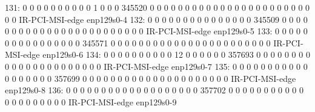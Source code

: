  131:          0          0          0          0          0          0          0          0          0          0          1          0          0          0     345520          0          0          0          0          0          0          0          0          0          0          0          0          0          0          0          0          0          0          0          0          0          0          0          0          0  IR-PCI-MSI-edge      enp129s0-4
 132:          0          0          0          0          0          0          0          0          0          0          0          0          0          0          0     345509          0          0          0          0          0          0          0          0          0          0          0          0          0          0          0          0          0          0          0          0          0          0          0          0  IR-PCI-MSI-edge      enp129s0-5
 133:          0          0          0          0          0          0          0          0          0          0          0          0          0          0          0          0     345571          0          0          0          0          0          0          0          0          0          0          0          0          0          0          0          0          0          0          0          0          0          0          0  IR-PCI-MSI-edge      enp129s0-6
 134:          0          0          0          0          0          0          0          0          0          0         12          0          0          0          0          0          0     357693          0          0          0          0          0          0          0          0          0          0          0          0          0          0          0          0          0          0          0          0          0          0  IR-PCI-MSI-edge      enp129s0-7
 135:          0          0          0          0          0          0          0          0          0          0          0          0          0          0          0          0          0          0     357699          0          0          0          0          0          0          0          0          0          0          0          0          0          0          0          0          0          0          0          0          0  IR-PCI-MSI-edge      enp129s0-8
 136:          0          0          0          0          0          0          0          0          0          0          0          0          0          0          0          0          0          0          0     357702          0          0          0          0          0          0          0          0          0          0          0          0          0          0          0          0          0          0          0          0  IR-PCI-MSI-edge      enp129s0-9
